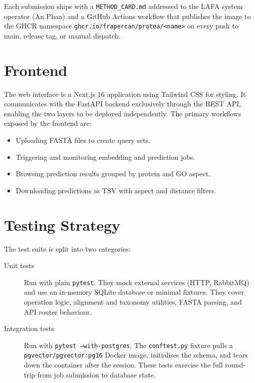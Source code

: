 Each submission ships with a \texttt{METHOD\_CARD.md} addressed to the
LAFA system operator (An Phan) and a GitHub Actions workflow that publishes
the image to the GHCR namespace \texttt{ghcr.io/frapercan/protea/<name>}
on every push to main, release tag, or manual dispatch.

\section{Frontend}
\label{sec:frontend}

The web interface is a Next.js 16 application using Tailwind CSS for
styling. It communicates with the FastAPI backend exclusively through the REST
API, enabling the two layers to be deployed independently. The primary
workflows exposed by the frontend are:

\begin{itemize}
  \item Uploading FASTA files to create query sets.
  \item Triggering and monitoring embedding and prediction jobs.
  \item Browsing prediction results grouped by protein and GO aspect.
  \item Downloading predictions as TSV with aspect and distance filters.
\end{itemize}

\section{Testing Strategy}
\label{sec:testing}

The test suite is split into two categories:

\begin{description}
  \item[Unit tests] Run with plain \texttt{pytest}. They mock external services
    (HTTP, RabbitMQ) and use an in-memory SQLite database or minimal fixtures.
    They cover operation logic, alignment and taxonomy utilities, FASTA parsing,
    and API router behaviour.
  \item[Integration tests] Run with \texttt{pytest --with-postgres}. The
    \texttt{conftest.py} fixture pulls a \texttt{pgvector/pgvector:pg16} Docker
    image, initialises the schema, and tears down the container after the session.
    These tests exercise the full round-trip from job submission to database
    state.
\end{description}

